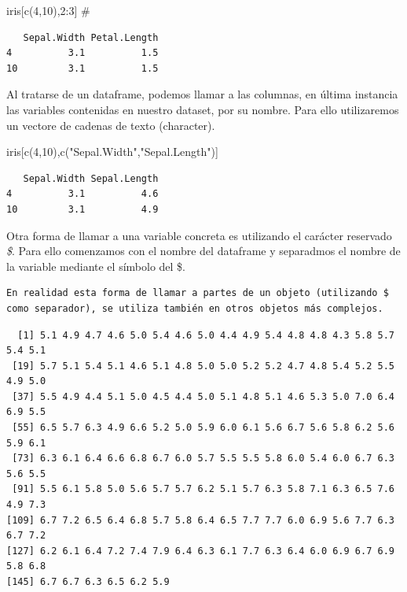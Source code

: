 \documentclass[
  letterpaper,
  DIV=11,
  numbers=noendperiod]{scrreprt}
\newenvironment{Shaded}{\begin{snugshade}}{\end{snugshade}}
\newcommand{\CommentTok}[1]{\textcolor[rgb]{0.37,0.37,0.37}{#1}}
\newcommand{\DecValTok}[1]{\textcolor[rgb]{0.68,0.00,0.00}{#1}}
\newcommand{\FunctionTok}[1]{\textcolor[rgb]{0.28,0.35,0.67}{#1}}
\newcommand{\NormalTok}[1]{\textcolor[rgb]{0.00,0.23,0.31}{#1}}
\newcommand{\SpecialCharTok}[1]{\textcolor[rgb]{0.37,0.37,0.37}{#1}}
\newcommand{\StringTok}[1]{\textcolor[rgb]{0.13,0.47,0.30}{#1}}
\begin{document}
\begin{Shaded}
\begin{Highlighting}[]
\NormalTok{iris[}\FunctionTok{c}\NormalTok{(}\DecValTok{4}\NormalTok{,}\DecValTok{10}\NormalTok{),}\DecValTok{2}\SpecialCharTok{:}\DecValTok{3}\NormalTok{] }\CommentTok{\#}
\end{Highlighting}
\end{Shaded}

\begin{verbatim}
   Sepal.Width Petal.Length
4          3.1          1.5
10         3.1          1.5
\end{verbatim}

Al tratarse de un dataframe, podemos llamar a las columnas, en última
instancia las variables contenidas en nuestro dataset, por su nombre.
Para ello utilizaremos un vectore de cadenas de texto (character).

\begin{Shaded}
\begin{Highlighting}[]
\NormalTok{iris[}\FunctionTok{c}\NormalTok{(}\DecValTok{4}\NormalTok{,}\DecValTok{10}\NormalTok{),}\FunctionTok{c}\NormalTok{(}\StringTok{"Sepal.Width"}\NormalTok{,}\StringTok{"Sepal.Length"}\NormalTok{)]}
\end{Highlighting}
\end{Shaded}

\begin{verbatim}
   Sepal.Width Sepal.Length
4          3.1          4.6
10         3.1          4.9
\end{verbatim}

Otra forma de llamar a una variable concreta es utilizando el carácter
reservado \emph{\$}. Para ello comenzamos con el nombre del dataframe y
separadmos el nombre de la variable mediante el símbolo del \$.

\begin{verbatim}
En realidad esta forma de llamar a partes de un objeto (utilizando $ como separador), se utiliza también en otros objetos más complejos.
\end{verbatim}

\begin{Shaded}
\end{Shaded}

\begin{verbatim}
  [1] 5.1 4.9 4.7 4.6 5.0 5.4 4.6 5.0 4.4 4.9 5.4 4.8 4.8 4.3 5.8 5.7 5.4 5.1
 [19] 5.7 5.1 5.4 5.1 4.6 5.1 4.8 5.0 5.0 5.2 5.2 4.7 4.8 5.4 5.2 5.5 4.9 5.0
 [37] 5.5 4.9 4.4 5.1 5.0 4.5 4.4 5.0 5.1 4.8 5.1 4.6 5.3 5.0 7.0 6.4 6.9 5.5
 [55] 6.5 5.7 6.3 4.9 6.6 5.2 5.0 5.9 6.0 6.1 5.6 6.7 5.6 5.8 6.2 5.6 5.9 6.1
 [73] 6.3 6.1 6.4 6.6 6.8 6.7 6.0 5.7 5.5 5.5 5.8 6.0 5.4 6.0 6.7 6.3 5.6 5.5
 [91] 5.5 6.1 5.8 5.0 5.6 5.7 5.7 6.2 5.1 5.7 6.3 5.8 7.1 6.3 6.5 7.6 4.9 7.3
[109] 6.7 7.2 6.5 6.4 6.8 5.7 5.8 6.4 6.5 7.7 7.7 6.0 6.9 5.6 7.7 6.3 6.7 7.2
[127] 6.2 6.1 6.4 7.2 7.4 7.9 6.4 6.3 6.1 7.7 6.3 6.4 6.0 6.9 6.7 6.9 5.8 6.8
[145] 6.7 6.7 6.3 6.5 6.2 5.9
\end{verbatim}
\end{document}
